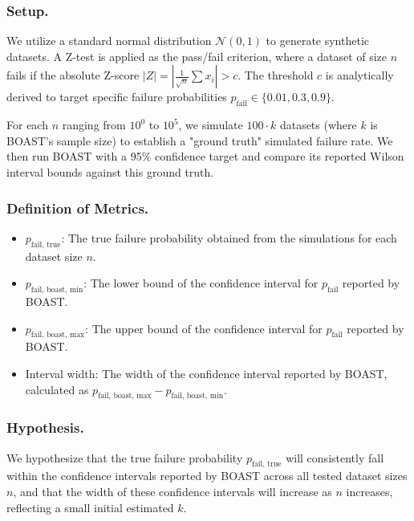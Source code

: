     \subsubsection{Setup.}

    We utilize a standard normal distribution $\mathcal{N}(0, 1)$ to generate synthetic datasets. A Z-test is applied as the pass/fail criterion, where a dataset of size $n$ fails if the absolute Z-score $|Z| = |\frac{1}{\sqrt{n}} \sum x_i| > c$. The threshold $c$ is analytically derived to target specific failure probabilities $p_\text{fail} \in \{0.01, 0.3, 0.9\}$. 

    For each $n$ ranging from $10^0$ to $10^5$, we simulate $100 \cdot k$ datasets (where $k$ is BOAST's sample size) to establish a "ground truth" simulated failure rate. We then run BOAST with a 95\% confidence target and compare its reported Wilson interval bounds against this ground truth.

    \subsubsection{Definition of Metrics.}

    \begin{itemize}
        \item $p_\text{fail, true}$: The true failure probability obtained from the simulations for each dataset size $n$.
        \item $p_\text{fail, boast, min}$: The lower bound of the confidence interval for $p_\text{fail}$ reported by BOAST.
        \item $p_\text{fail, boast, max}$: The upper bound of the confidence interval for $p_\text{fail}$ reported by BOAST.
        \item Interval width: The width of the confidence interval reported by BOAST, calculated as $p_\text{fail, boast, max} - p_\text{fail, boast, min}$.
    \end{itemize}

    \subsubsection{Hypothesis.}

    We hypothesize that the true failure probability $p_\text{fail, true}$ will consistently fall within the confidence intervals reported by BOAST across all tested dataset sizes $n$, and that the width of these confidence intervals will increase as $n$ increases, reflecting a small initial estimated $k$.

